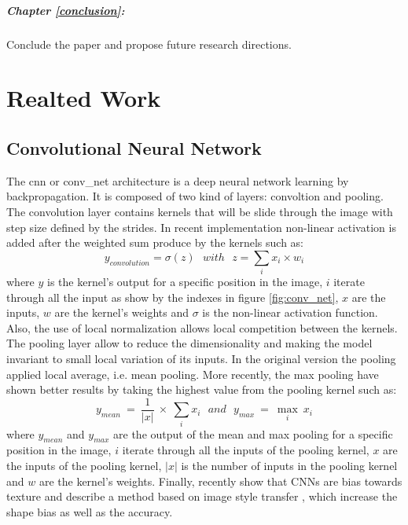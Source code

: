 \documentclass[11pt]{report}
\begin{document}
\paragraph{Chapter \ref{conclusion}:} Conclude the paper and propose future research directions.

\chapter{Realted Work} \label{related_work}

\section{Convolutional Neural Network}

The \acrshort{cnn} or \acrshort{conv_net} architecture \cite{NIPS1989_293} is a deep neural network learning by backpropagation. It is composed of two kind of layers: convoltion and pooling. The convolution layer contains kernels that will be slide through the image with step size defined by the strides. In recent implementation \cite{5537907} non-linear activation is added after the weighted sum produce by the kernels such as:
\begin{equation}
y_{convolution} = \sigma(z)\ \ \ with\ \ \ z = \sum_{i} x_i \times w_i
\end{equation}
where $y$ is the kernel's output for a specific position in the image, $i$ iterate through all the input as show by the indexes in figure \ref{fig:conv_net}, $x$ are the inputs, $w$ are the kernel's weights and $\sigma$ is the non-linear activation function. Also, the use of local normalization allows local competition between the kernels. The pooling layer allow to reduce the dimensionality and making the model invariant to small local variation of its inputs. In the original version \textcite{NIPS1989_293} the pooling applied local average, i.e. mean pooling. More recently, the max pooling have shown better results \cite{10.1007/978-3-642-15825-4_10} by taking the highest value from the pooling kernel such as:
\begin{equation}
y_{mean}\ =\ \frac{1}{|x|}\ \times\ \sum_{i} x_i\ \ \ and\ \ \ y_{max}\ =\ \max_{i}\ x_i
\end{equation}
where $y_{mean}$ and $y_{max}$ are the output of the mean and max pooling for a specific position in the image, $i$ iterate through all the inputs of the pooling kernel, $x$ are the inputs of the pooling kernel, $|x|$ is the number of inputs in the pooling kernel and $w$ are the kernel's weights. Finally, \textcite{DBLP:journals/corr/abs-1811-12231} recently show that CNNs are bias towards texture and describe a method based on image style transfer \cite{Gatys_2016_CVPR}, which increase the shape bias as well as the accuracy.
\end{document}
